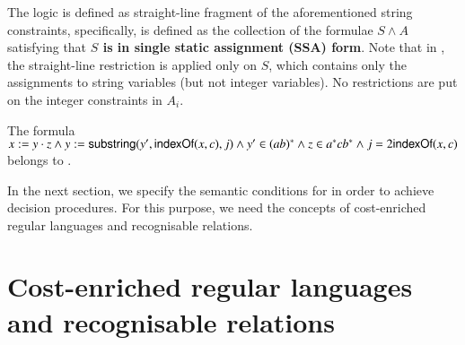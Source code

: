 \documentclass{llncs}
\begin{document}
The logic {\slint} is defined as straight-line fragment of the aforementioned string constraints, specifically, {\slint} is defined as the collection of the formulae $S \wedge A$ satisfying that {\bf $S$ is in single static assignment (SSA) form}.  Note that in {\slint}, the straight-line restriction is applied only on $S$, which contains only the assignments to string variables (but not integer variables). No restrictions are put on the integer constraints in $A_i$.
%
%

\begin{example}
The formula $x:= y \cdot z \wedge y := \mathsf{substring}(y', \mathsf{indexOf}(x, c), j)  \wedge y' \in (ab)^* \wedge z \in a^* c b^* \wedge   j = 2 \mathsf{indexOf}(x, c)$ belongs to \slint.
\end{example}

In the next section, we specify the semantic conditions for {\slint} in order to achieve decision procedures. For this purpose, we need the concepts of cost-enriched regular languages and recognisable relations. 



\section{Cost-enriched regular languages and recognisable relations}
\end{document}
